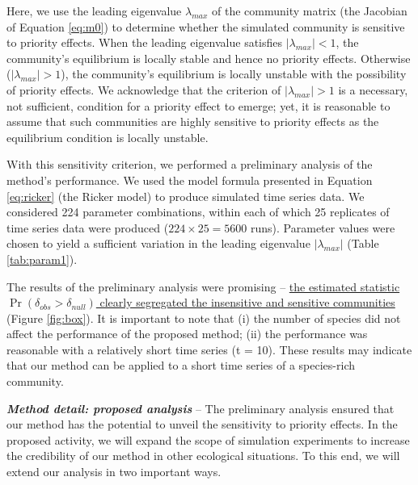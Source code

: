 \documentclass[12pt, class=article, crop=false]{standalone}
\begin{document}

Here, we use the leading eigenvalue $\lambda_{max}$ of the community matrix (the Jacobian of Equation \ref{eq:m0}) to determine whether the simulated community is sensitive to priority effects.
When the leading eigenvalue satisfies $|\lambda_{max}| < 1$, the community's equilibrium is locally stable and hence no priority effects.
Otherwise ($|\lambda_{max}| > 1$), the community's equilibrium is locally unstable with the possibility of priority effects.
We acknowledge that the criterion of $|\lambda_{max}| > 1$ is a necessary, not sufficient, condition for a priority effect to emerge; yet, it is reasonable to assume that such communities are highly sensitive to priority effects as the equilibrium condition is locally unstable. 

With this sensitivity criterion, we performed a preliminary analysis of the method's performance. We used the model formula presented in Equation \ref{eq:ricker} (the Ricker model) to produce simulated time series data. We considered 224 parameter combinations, within each of which 25 replicates of time series data were produced ($224 \times 25 = 5600$ runs). Parameter values were chosen to yield a sufficient variation in the leading eigenvalue $|\lambda_{max}|$ (Table \ref{tab:param1}).

The results of the preliminary analysis were promising -- \ul{the estimated statistic $\Pr(\delta_{obs} > \delta_{null})$ clearly segregated the insensitive and sensitive communities} (Figure \ref{fig:box}). It is important to note that (i) the number of species did not affect the performance of the proposed method; (ii) the performance was reasonable with a relatively short time series (t = 10). These results may indicate that our method can be applied to a short time series of a species-rich community. 

\textbf{\textit{Method detail: proposed analysis}} -- 
The preliminary analysis ensured that our method has the potential to unveil the sensitivity to priority effects.
In the proposed activity, we will expand the scope of simulation experiments to increase the credibility of our method in other ecological situations.
To this end, we will extend our analysis in two important ways.
\end{document}
